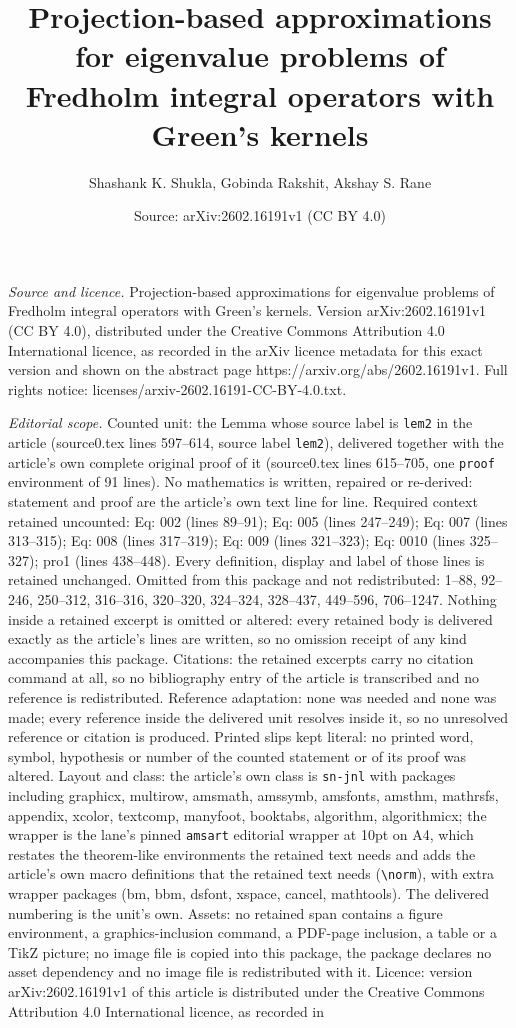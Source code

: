 \documentclass[10pt,a4paper]{amsart}
\title[Projection-based approximations for eigenvalue problems of F]{Projection-based approximations for eigenvalue problems of Fredholm integral operators with Green's kernels}
\author{Shashank K. Shukla, Gobinda Rakshit, Akshay S. Rane}
\date{Source: arXiv:2602.16191v1 (CC BY 4.0)}
\begin{document}
\maketitle

\noindent\emph{Source and licence.} Projection-based approximations for eigenvalue problems of Fredholm integral operators with Green's kernels. Version arXiv:2602.16191v1 (CC BY 4.0), distributed under the Creative Commons Attribution 4.0 International licence, as recorded in the arXiv licence metadata for this exact version and shown on the abstract page https://arxiv.org/abs/2602.16191v1. Full rights notice: licenses/arxiv-2602.16191-CC-BY-4.0.txt.\par\smallskip

\noindent\textit{Editorial scope.} Counted unit: the Lemma whose source label is \texttt{lem2} in the article (source0.tex lines 597--614, source label \texttt{lem2}), delivered together with the article's own complete original proof of it (source0.tex lines 615--705, one \texttt{proof} environment of 91 lines). No mathematics is written, repaired or re-derived: statement and proof are the article's own text line for line. Required context retained uncounted: Eq: 002 (lines 89--91); Eq: 005 (lines 247--249); Eq: 007 (lines 313--315); Eq: 008 (lines 317--319); Eq: 009 (lines 321--323); Eq: 0010 (lines 325--327); pro1 (lines 438--448). Every definition, display and label of those lines is retained unchanged. Omitted from this package and not redistributed: 1--88, 92--246, 250--312, 316--316, 320--320, 324--324, 328--437, 449--596, 706--1247. Nothing inside a retained excerpt is omitted or altered: every retained body is delivered exactly as the article's lines are written, so no omission receipt of any kind accompanies this package. Citations: the retained excerpts carry no citation command at all, so no bibliography entry of the article is transcribed and no reference is redistributed. Reference adaptation: none was needed and none was made; every reference inside the delivered unit resolves inside it, so no unresolved reference or citation is produced. Printed slips kept literal: no printed word, symbol, hypothesis or number of the counted statement or of its proof was altered. Layout and class: the article's own class is \texttt{sn-jnl} with packages including graphicx, multirow, amsmath, amssymb, amsfonts, amsthm, mathrsfs, appendix, xcolor, textcomp, manyfoot, booktabs, algorithm, algorithmicx; the wrapper is the lane's pinned \texttt{amsart} editorial wrapper at 10pt on A4, which restates the theorem-like environments the retained text needs and adds the article's own macro definitions that the retained text needs (\texttt{\textbackslash norm}), with extra wrapper packages (bm, bbm, dsfont, xspace, cancel, mathtools). The delivered numbering is the unit's own. Assets: no retained span contains a figure environment, a graphics-inclusion command, a PDF-page inclusion, a table or a TikZ picture; no image file is copied into this package, the package declares no asset dependency and no image file is redistributed with it. Licence: version arXiv:2602.16191v1 of this article is distributed under the Creative Commons Attribution 4.0 International licence, as recorded in 
\end{document}
